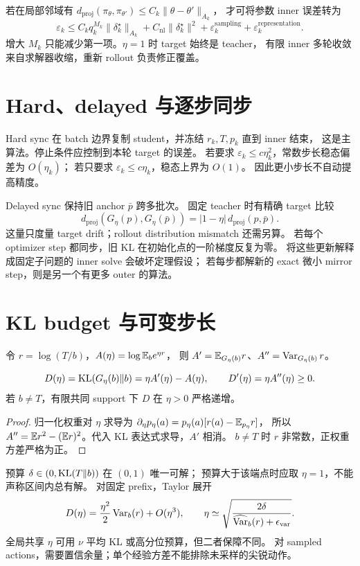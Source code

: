 若在局部邻域有
$d_{\mathrm{proj}}(\pi_\theta,\pi_{\theta'})\le C_k\|\theta-\theta'\|_{A_k}$，
才可将参数 inner 误差转为
\[
 \varepsilon_k\le C_kq_k^{M_k}\|\delta_k^\star\|_{A_k}
              +C_{\mathrm{nl}}\|\delta_k^\star\|^2
              +\varepsilon_k^{\mathrm{sampling}}
              +\varepsilon_k^{\mathrm{representation}}.
\]
增大 $M_k$ 只能减少第一项。$\eta=1$ 时 target 始终是 teacher，
有限 inner 多轮收敛来自求解器收缩，重新 rollout 负责修正覆盖。

\section{Hard、delayed 与逐步同步}
Hard sync 在 batch 边界复制 student，并冻结 $r_k,T,p_k$ 直到 inner 结束，
这是主算法。停止条件应控制到本轮 target 的误差。
若要求 $\varepsilon_k\le c\eta_k^2$，常数步长稳态偏差为 $O(\eta_k)$；
若只要求 $\varepsilon_k\le c\eta_k$，稳态上界为 $O(1)$。
因此更小步长不自动提高精度。

Delayed sync 保持旧 anchor $\bar p$ 跨多批次。
固定 teacher 时有精确 target 比较
\[
 d_{\mathrm{proj}}(G_\eta(p),G_\eta(\bar p))
 =|1-\eta|\,d_{\mathrm{proj}}(p,\bar p).
\]
这量只度量 target drift；rollout distribution mismatch 还需另算。
若每个 optimizer step 都同步，旧 KL 在初始化点的一阶梯度反复为零。
将这些更新解释成固定子问题的 inner solve 会破坏定理假设；
若每步都解新的 exact 微小 mirror step，则是另一个有更多 outer 的算法。

\section{KL budget 与可变步长}
令 $r=\log(T/b)$，$A(\eta)=\log\mathbb{E}_b e^{\eta r}$，
则 $A'=\mathbb{E}_{G_\eta(b)}r$、$A''=\operatorname{Var}_{G_\eta(b)}r$。
\begin{theorem}\label{thm:budget}
\[
 D(\eta)=\operatorname{KL}(G_\eta(b)\Vert b)=\eta A'(\eta)-A(\eta),\qquad
 D'(\eta)=\eta A''(\eta)\ge0.
\]
若 $b\ne T$，有限共同 support 下 $D$ 在 $\eta>0$ 严格递增。
\end{theorem}
\begin{proof}
归一化权重对 $\eta$ 求导为
$\partial_\eta p_\eta(a)=p_\eta(a)[r(a)-\mathbb{E}_{p_\eta}r]$，
所以 $A''=\mathbb{E} r^2-(\mathbb{E} r)^2$。代入 KL 表达式求导，$A'$ 相消。
$b\ne T$ 时 $r$ 非常数，正权重方差严格为正。
\end{proof}
预算 $\delta\in(0,\operatorname{KL}(T\Vert b))$ 在 $(0,1)$ 唯一可解；
预算大于该端点时应取 $\eta=1$，不能声称区间内总有解。
对固定 prefix，Taylor 展开
\[
 D(\eta)=\frac{\eta^2}{2}\operatorname{Var}_b(r)+O(\eta^3),\qquad
 \eta\simeq\sqrt{\frac{2\delta}{\widehat{\operatorname{Var}}_b(r)+\epsilon_{\mathrm{var}}}}.
\]
全局共享 $\eta$ 可用 $\nu$ 平均 KL 或高分位预算，但二者保障不同。
对 sampled actions，需要置信余量；单个经验方差不能排除未采样的尖锐动作。

